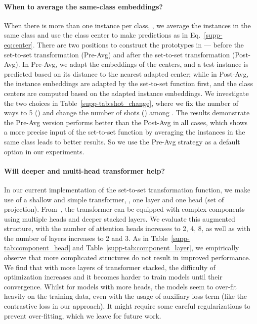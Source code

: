 \paragraph{When to average the same-class embeddings?}When there is more than one instance per class, \ie , we average the instances in the same class and use the class center to make predictions as in Eq.~\ref{supp-eq:center}. There are two positions to construct the prototypes in {\feat} --- before the set-to-set transformation (Pre-Avg) and after the set-to-set transformation (Post-Avg). In Pre-Avg, we adapt the embeddings of the centers, and a test instance is predicted based on its distance to the nearest adapted center; while in Post-Avg, the instance embeddings are adapted by the set-to-set function first, and the class centers are computed based on the adapted instance embeddings. We investigate the two choices in Table~\ref{supp-tab:shot_change}, where we fix the number of ways to 5 () and change the number of shots () among . The results demonstrate the Pre-Avg version performs better than the Post-Avg in all cases, which shows a more precise input of the set-to-set function by averaging the instances in the same class leads to better results. So we use the Pre-Avg strategy as a default option in our experiments.

\paragraph{Will deeper and multi-head transformer help?} In our current implementation of the set-to-set transformation function, we make use of a shallow and simple transformer, \ie, one layer and one head (set of projection). From~\cite{VaswaniNIPS17Attention}, the transformer can be equipped with complex components using multiple heads and deeper stacked layers. We evaluate this augmented structure, with the number of attention heads increases to 2, 4, 8, as well as with the number of layers increases to 2 and 3. As in Table~\ref{supp-tab:component_head} and Table~\ref{supp-tab:component_layer}, we empirically observe that more complicated structures do not result in improved performance. We find that with more layers of transformer stacked, the difficulty of optimization increases and it becomes harder to train models until their convergence. Whilst for models with more heads, the models seem to over-fit heavily on the training data, even with the usage of auxiliary loss term (like the contrastive loss in our approach). It might require some careful regularizations to prevent over-fitting, which we leave for future work.

